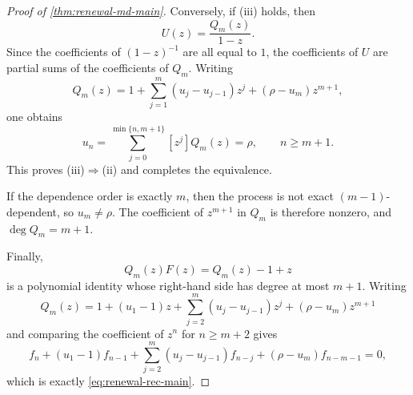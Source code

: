 \begin{proof}[Proof of \cref{thm:renewal-md-main}]
Conversely, if \textup{(iii)} holds, then
\[
U(z)=\frac{Q_m(z)}{1-z}.
\]
Since the coefficients of $(1-z)^{-1}$ are all equal to $1$, the coefficients of $U$ are partial sums of the coefficients of $Q_m$. Writing
\[
Q_m(z)=1+\sum_{j=1}^{m}(u_j-u_{j-1})z^j+(\rho-u_m)z^{m+1},
\]
one obtains
\[
u_n=\sum_{j=0}^{\min\{n,m+1\}}[z^j]Q_m(z)=\rho,
\qquad n\ge m+1.
\]
This proves \textup{(iii)}$\Rightarrow$\textup{(ii)} and completes the equivalence.

If the dependence order is exactly $m$, then the process is not exact $(m-1)$-dependent, so $u_m\neq\rho$. The coefficient of $z^{m+1}$ in $Q_m$ is therefore nonzero, and $\deg Q_m=m+1$.

Finally,
\[
Q_m(z)F(z)=Q_m(z)-1+z
\]
is a polynomial identity whose right-hand side has degree at most $m+1$. Writing
\[
Q_m(z)=1+(u_1-1)z+\sum_{j=2}^{m}(u_j-u_{j-1})z^j+(\rho-u_m)z^{m+1}
\]
and comparing the coefficient of $z^n$ for $n\ge m+2$ gives
\[
f_n+(u_1-1)f_{n-1}+\sum_{j=2}^{m}(u_j-u_{j-1})f_{n-j}+(\rho-u_m)f_{n-m-1}=0,
\]
which is exactly \eqref{eq:renewal-rec-main}.
\end{proof}

